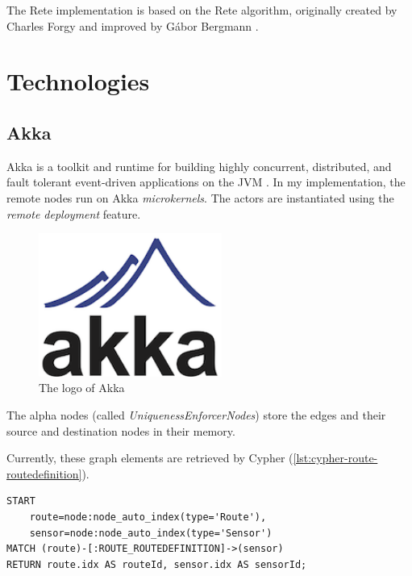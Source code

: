 The Rete implementation is based on the Rete algorithm, originally created by Charles Forgy \cite{Forgy} and improved by Gábor Bergmann \cite{BergmannRete}.

\section{Technologies}

\subsection{Akka}

Akka is a toolkit and runtime for building highly concurrent, distributed, and fault tolerant event-driven applications on the JVM \cite{akka}. In my implementation, the remote nodes run on Akka \textit{microkernels}. The actors are instantiated using the \textit{remote deployment} feature.

\begin{figure}
\begin{center}
\includegraphics[width=6cm]{figures/akka-logo}
\caption{The logo of Akka}
\label{fig:akka-logo}
\end{center}
\end{figure}

The alpha nodes (called \textit{UniquenessEnforcerNodes}) store the edges and their source and destination nodes in their memory.

Currently, these graph elements are retrieved by Cypher (\autoref{lst:cypher-route-routedefinition}).

\begin{lstlisting}[caption=Cypher query to retrieve all \texttt{ROUTE\_ROUTEDEFINITION} edges, label=lst:cypher-route-routedefinition, breaklines=true]
START
    route=node:node_auto_index(type='Route'),
    sensor=node:node_auto_index(type='Sensor')
MATCH (route)-[:ROUTE_ROUTEDEFINITION]->(sensor)
RETURN route.idx AS routeId, sensor.idx AS sensorId;
\end{lstlisting}

